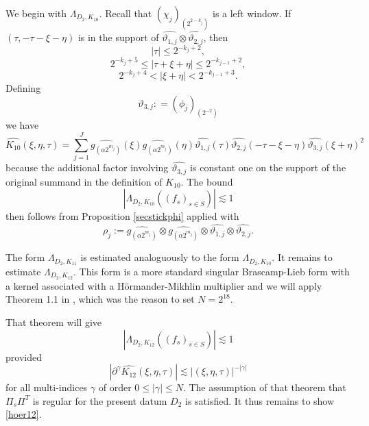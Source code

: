 \documentclass[12pt,reqno]{amsart}
\theoremstyle{plain}
\theoremstyle{definition}
\numberwithin{equation}{section}
\begin{document}
We begin with $\Lambda_{D_2,K_{10}}$.
Recall that ${(\chi_j)_{(2^{2-k_j})}}$ is a left window.
If $(\tau, -\tau-\xi-\eta)$ is in the support of  $\widehat{\vartheta_{1,j}}\otimes \widehat{\vartheta_{2,j}}$, then 
\[|\tau| \leq 2^{-k_j+2}, \]
\[2^{-k_j+5}\leq |\tau+\xi+\eta| \leq 2^{-k_{j-1}+2}, \]
\[2^{-k_j+4}<|\xi+\eta|<2^{-k_{j-1}+3}.\]
Defining 
 \begin{equation*}
    \vartheta_{3,j}:  = (\phi_{j})_{(2^{-2})}
 \end{equation*}
we have
\[\widehat{K_{10}}(\xi,\eta,\tau) = \sum_{j=1}^J \widehat{g_{(\alpha 2^{m_j})}} (\xi)  \widehat{g_{(\alpha 2^{m_j})}}(\eta)\widehat{\vartheta_{1,j}}(\tau) \widehat{\vartheta_{2,j}}(-\tau-\xi-\eta) \widehat{\vartheta_{3,j}}(\xi+\eta)^2 \]
because the additional factor involving $\widehat{\vartheta_{3,j}}$  is constant 
one on the support of the original summand
in the definition of $K_{10}$. The bound
\[|\Lambda_{D_2,K_{10}}((f_s)_{s\in S})| \lesssim 1\]
then follows from Proposition \ref{secstickphi} applied with
 \[\rho_j:=\widehat{g_{(\alpha 2^{m_j})}} \otimes  \widehat{g_{(\alpha 2^{m_j})}}\otimes\widehat{\vartheta_{1,j}}\otimes \widehat{\vartheta_{2,j}}.\]

The form $\Lambda_{D_2,K_{11}}$ is estimated analoguously
to the form $\Lambda_{D_2,K_{10}}$.
It remains to estimate $\Lambda_{D_2,K_{12}}$. This form is a 
more standard singular Brascamp-Lieb form with a kernel associated with a  H\"ormander-Mikhlin multiplier and we will
apply Theorem 1.1 in \cite{MR4510172}, which was the reason to set $N=2^{18}$.

That theorem will give
\[|\Lambda_{D_2,K_{12}}((f_s)_{s\in S})| \lesssim 1\]
provided
\begin{equation}\label{hoer12}
|\partial^\gamma \widehat{K_{12}}(\xi,\eta,\tau)|
\lesssim |(\xi,\eta,\tau)|^{-|\gamma|} 
\end{equation}
for all multi-indices $\gamma$ of order $0\le |\gamma|\le N$.
The assumption of that theorem that $\Pi_s\Pi^T$ is regular 
for the present datum $D_2$ is satisfied.
It thus remains to show \eqref{hoer12}.
\end{document}

